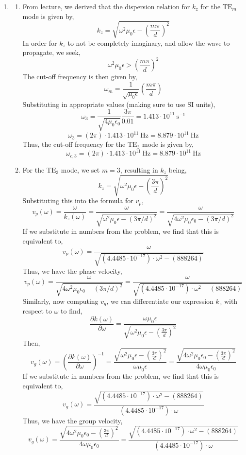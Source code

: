 \documentclass[12pt]{article}
\begin{document}
\begin{enumerate}
	\item [9.3]
	\begin{enumerate}
		\item [(a)]
		From lecture, we derived that the dispersion relation for $k_z$ for the $\mathrm{TE}_m$ mode is given by,
		\[k_z= \sqrt{\omega^2\mu_0\epsilon-\left(\frac{m\pi}{d}\right)^2}\]
		In order for $k_z$ to not be completely imaginary, and allow the wave to propagate, we seek,
		\[\omega^2\mu_0\epsilon>\left(\frac{m\pi}{d}\right)^2\]
		The cut-off frequency is then given by,
		\[\omega_m=\frac{1}{\sqrt{\mu_0\epsilon}}\left(\frac{m\pi}{d}\right)\]
		Substituting in appropriate values (making sure to use SI units),
		\[\omega_3 = \frac{1}{\sqrt{4\mu_0\epsilon_0}}\frac{3\pi}{0.01}=1.413\cdot 10^{11}\:\mathrm{s^{-1}}\]
		\[\omega_3 = (2\pi)\cdot 1.413\cdot 10^{11}\:\mathrm{Hz}=8.879\cdot 10^{11}\:\mathrm{Hz}\]
		Thus, the cut-off frequency for the $\mathrm{TE}_3$ mode is given by,
		\[\boxed{\omega_{c,3} = (2\pi)\cdot 1.413\cdot 10^{11}\:\mathrm{Hz}=8.879\cdot 10^{11}\:\mathrm{Hz}}\]

		\item [(b)]
		For the $\mathrm{TE}_3$ mode, we set $m=3$, resulting in $k_z$ being,
		\[k_z=\sqrt{\omega^2\mu_0\epsilon-\left(\frac{3\pi}{d}\right)^2}\]
		Substituting this into the formula for $v_p$,
		\[v_p(\omega) = \frac{\omega}{k_z(\omega)}=\frac{\omega}{\sqrt{\omega^2\mu_0\epsilon-(3\pi/d)^2}}=\frac{\omega}{\sqrt{4\omega^2\mu_0\epsilon_0-(3\pi/d)^2}}\]
		If we substitute in numbers from the problem, we find that this is equivalent to,
		\[v_p(\omega) = \frac{\omega}{\sqrt{(4.4485\cdot 10^{-17})\cdot\omega^2-(888264)}}\]
		Thus, we have the phase velocity,
		\[\boxed{v_p(\omega) =\frac{\omega}{\sqrt{4\omega^2\mu_0\epsilon_0-(3\pi/d)^2}} =\frac{\omega}{\sqrt{(4.4485\cdot 10^{-17})\cdot\omega^2-(888264)}}}\]
		Similarly, now computing $v_g$, we can differentiate our expression $k_z$ with respect to $\omega$ to find,
		\[\frac{\partial k(\omega)}{\partial \omega}=\frac{\omega \mu_0\epsilon}{\sqrt{\omega^2\mu_0\epsilon-\left(\frac{3\pi}{d}\right)^2}}\]
		Then,
		\[v_g(\omega)=\left(\frac{\partial k(\omega)}{\partial \omega}\right)^{-1}=\frac{\sqrt{\omega^2\mu_0\epsilon -\left(\frac{3\pi}{d}\right)^2}}{\omega \mu_0\epsilon}=\frac{\sqrt{4\omega^2\mu_0\epsilon_0-\left(\frac{3\pi}{d}\right)^2}}{4\omega \mu_0\epsilon_0}\]
		If we substitute in numbers from the problem, we find that this is equivalent to,
		\[v_g(\omega)=\frac{\sqrt{(4.4485\cdot 10^{-17})\cdot \omega^2-(888264)}}{(4.4485\cdot 10^{-17})\cdot \omega}\]
		Thus, we have the group velocity,
		\[\boxed{v_g(\omega)=\frac{\sqrt{4\omega^2\mu_0\epsilon_0-\left(\frac{3\pi}{d}\right)^2}}{4\omega \mu_0\epsilon_0}=\frac{\sqrt{(4.4485\cdot 10^{-17})\cdot \omega^2-(888264)}}{(4.4485\cdot 10^{-17})\cdot \omega}}\]


\end{enumerate}
\end{enumerate}
\end{document}
